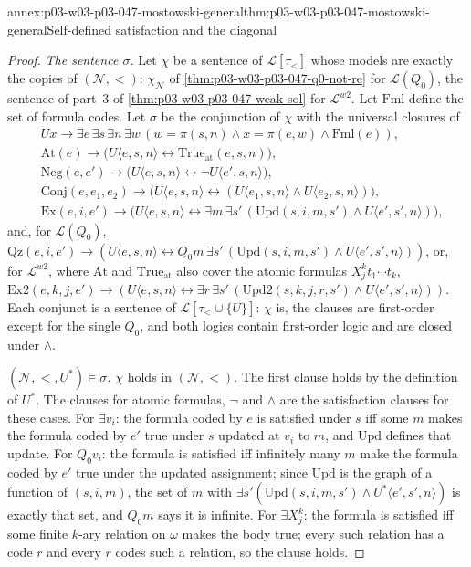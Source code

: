 \begin{annexitem}{annex:p03-w03-p03-047-mostowski-general}{thm:p03-w03-p03-047-mostowski-general}{Self-defined satisfaction and the diagonal}
\begin{proof}
\emph{The sentence \(\sigma\).}  Let \(\chi\) be a sentence of
\(\mathscr L[\tau_<]\) whose models are exactly the copies of
\((\mathcal N,<)\): \(\chi_{\mathcal N}\) of
\cref{thm:p03-w03-p03-047-q0-not-re} for \(\mathscr L(Q_0)\), the sentence of
part~3 of \cref{thm:p03-w03-p03-047-weak-sol} for \(\mathscr L^{w2}\).  Let
\(\mathrm{Fml}\) define the set of formula codes.  Let \(\sigma\) be the
conjunction of \(\chi\) with the universal closures of
\begin{align*}
 &Ux\to\exists e\,\exists s\,\exists n\,\exists w\,(w=\pi(s,n)\land x=\pi(e,w)\land\mathrm{Fml}(e)),\\
 &\mathrm{At}(e)\to\bigl(U\langle e,s,n\rangle\leftrightarrow\mathrm{True}_{\mathrm{at}}(e,s,n)\bigr),\\
 &\mathrm{Neg}(e,e')\to\bigl(U\langle e,s,n\rangle\leftrightarrow\neg U\langle e',s,n\rangle\bigr),\\
 &\mathrm{Conj}(e,e_1,e_2)\to\bigl(U\langle e,s,n\rangle\leftrightarrow(U\langle e_1,s,n\rangle\land U\langle e_2,s,n\rangle)\bigr),\\
 &\mathrm{Ex}(e,i,e')\to\bigl(U\langle e,s,n\rangle\leftrightarrow\exists m\,\exists s'\,(\mathrm{Upd}(s,i,m,s')\land U\langle e',s',n\rangle)\bigr),
\end{align*}
and, for \(\mathscr L(Q_0)\),
\(\mathrm{Qz}(e,i,e')\to(U\langle e,s,n\rangle\leftrightarrow Q_0m\,\exists s'\,(\mathrm{Upd}(s,i,m,s')\land U\langle e',s',n\rangle))\),
or, for \(\mathscr L^{w2}\), where \(\mathrm{At}\) and
\(\mathrm{True}_{\mathrm{at}}\) also cover the atomic formulas
\(X^k_jt_1\cdots t_k\),
\(\mathrm{Ex2}(e,k,j,e')\to(U\langle e,s,n\rangle\leftrightarrow\exists r\,\exists s'\,(\mathrm{Upd2}(s,k,j,r,s')\land U\langle e',s',n\rangle))\).
Each conjunct is a sentence of \(\mathscr L[\tau_<\cup\{U\}]\): \(\chi\) is,
the clauses are first-order except for the single \(Q_0\), and both logics
contain first-order logic and are closed under \(\land\).

\emph{\((\mathcal N,<,U^\ast)\models\sigma\).}  \(\chi\) holds in
\((\mathcal N,<)\).  The first clause holds by the definition of
\(U^\ast\).  The clauses for atomic formulas, \(\neg\) and \(\land\) are
the satisfaction clauses for these cases.  For \(\exists v_i\): the formula
coded by \(e\) is satisfied under \(s\) iff some \(m\) makes the formula
coded by \(e'\) true under \(s\) updated at \(v_i\) to \(m\), and
\(\mathrm{Upd}\) defines that update.  For \(Q_0v_i\): the formula is
satisfied iff infinitely many \(m\) make the formula coded by \(e'\) true
under the updated assignment; since \(\mathrm{Upd}\) is the graph of a
function of \((s,i,m)\), the set of \(m\) with
\(\exists s'(\mathrm{Upd}(s,i,m,s')\land U^\ast\langle e',s',n\rangle)\) is
exactly that set, and \(Q_0m\) says it is infinite.  For \(\exists X^k_j\):
the formula is satisfied iff some finite \(k\)-ary relation on \(\omega\)
makes the body true; every such relation has a code \(r\) and every \(r\)
codes such a relation, so the clause holds.


\end{proof}
\end{annexitem}
